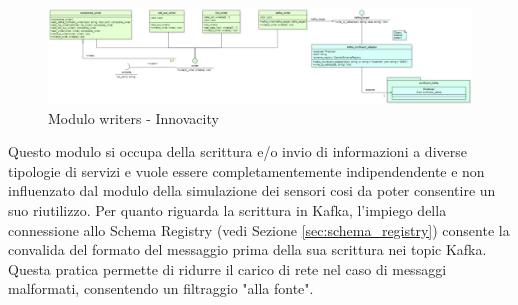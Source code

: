 \begin{figure}[H]
    \centering
    \includegraphics[width=1.1\textwidth]{../Images/SpecificaTecnica/writerModule.PNG}
    \caption{Modulo writers - Innovacity}
    \label{fig: writersModule}
\end{figure}

Questo modulo si occupa della scrittura e/o invio di informazioni a diverse tipologie di servizi e vuole essere completamentemente indipendendente e non influenzato dal modulo della simulazione dei sensori cosi da poter consentire un suo riutilizzo.
Per quanto riguarda la scrittura in Kafka, l'impiego della connessione allo Schema Registry (vedi Sezione \ref{sec:schema_registry}) consente la convalida del formato del messaggio prima della sua scrittura nei topic Kafka. Questa pratica permette di ridurre il carico di rete nel caso di messaggi malformati, consentendo un filtraggio "alla fonte".

